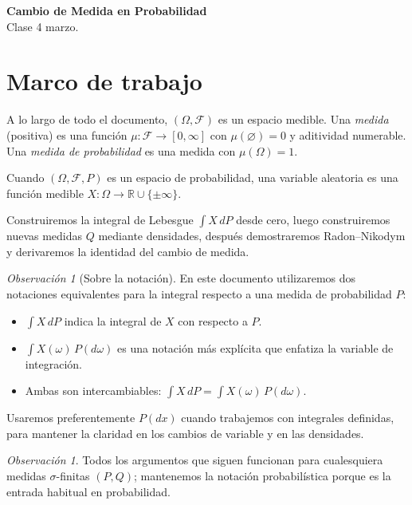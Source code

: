 \documentclass[11pt,a4paper]{article}
\theoremstyle{plain}
\theoremstyle{definition}
\theoremstyle{remark}
\newtheorem{remark}[theorem]{Observación}
\newcommand{\1}{\mathbf{1}}
\newcommand{\RR}{\mathbb{R}}
\newcommand{\cF}{\mathcal{F}}
\begin{document}
\begin{center}
{\Large \textbf{Cambio de Medida en Probabilidad}\\[4pt]
{\small Clase 4 marzo.}}
\end{center}

\tableofcontents

\section{Marco de trabajo}

A lo largo de todo el documento, $(\Omega,\cF)$ es un espacio medible. Una \emph{medida} (positiva) es una función $\mu:\cF\to[0,\infty]$ con $\mu(\varnothing)=0$ y aditividad numerable. Una \emph{medida de probabilidad} es una medida con $\mu(\Omega)=1$.

Cuando $(\Omega,\cF,P)$ es un espacio de probabilidad, una variable aleatoria es una función medible $X:\Omega\to\RR\cup\{\pm\infty\}$.

Construiremos la integral de Lebesgue $\int X\,dP$ desde cero, luego construiremos nuevas medidas $Q$ mediante densidades, después demostraremos Radon--Nikodym y derivaremos la identidad del cambio de medida.

\begin{remark}[Sobre la notación]
En este documento utilizaremos dos notaciones equivalentes para la integral respecto a una medida de probabilidad $P$:
\begin{itemize}
\item $\displaystyle\int X\,dP$ indica la integral de $X$ con respecto a $P$.
\item $\displaystyle\int X(\omega)\,P(d\omega)$ es una notación más explícita que enfatiza la variable de integración.
\item Ambas son intercambiables: $\int X\,dP = \int X(\omega)\,P(d\omega)$.
\end{itemize}
Usaremos preferentemente $P(dx)$ cuando trabajemos con integrales definidas, para mantener la claridad en los cambios de variable y en las densidades.
\end{remark}

\begin{remark}
Todos los argumentos que siguen funcionan para cualesquiera medidas $\sigma$-finitas $(P,Q)$; mantenemos la notación probabilística porque es la entrada habitual en probabilidad.
\end{remark}
\end{document}
